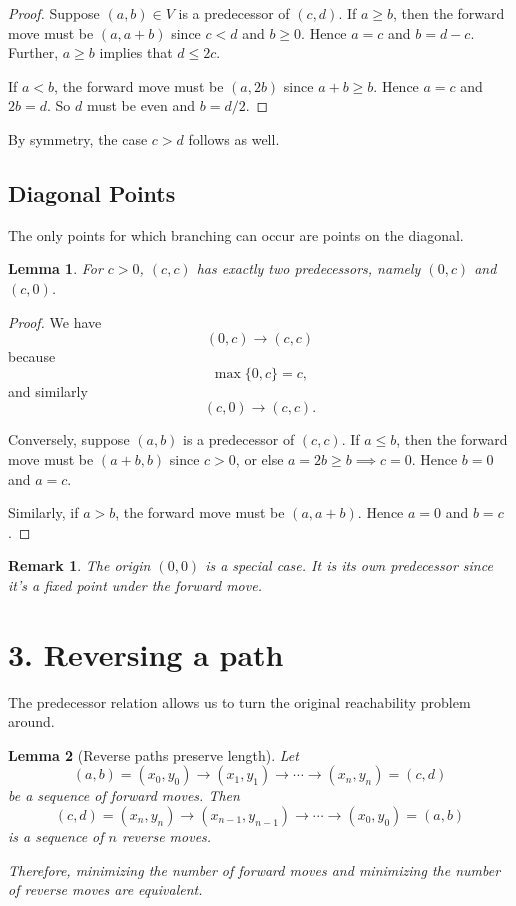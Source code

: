 \documentclass{article}
\newtheorem{lemma}{Lemma}
\newtheorem{remark}{Remark}
\begin{document}
\begin{proof}
	Suppose $(a,b)\in V$ is a predecessor of $(c, d)$. If $a \geq b$, then the forward move must be $(a, a+b)$ since $c<d$ and $b\geq 0$.
	Hence $a=c$ and $b=d-c$. Further, $a\geq b$ implies that $d\leq 2c$.

	If $a<b$, the forward move must be $(a, 2b)$ since $a+b\geq b$. Hence $a=c$ and $2b=d$. So $d$ must be even and $b=d/2$.

\end{proof}

By symmetry, the case $c > d$ follows as well.

\subsection*{Diagonal Points}

The only points for which branching can occur are points on the diagonal.

\begin{lemma}
	For $c>0$, $(c,c)$ has exactly two predecessors, namely $(0,c)$ and $(c,0)$.

\end{lemma}

\begin{proof}
	We have
	\[
		(0,c)\longrightarrow(c,c)
	\]
	because
	\[
		\max\{0,c\}=c,
	\]
	and similarly
	\[
		(c,0)\longrightarrow(c,c).
	\]

	Conversely, suppose $(a,b)$ is a predecessor of $(c,c)$. If $a \leq b$, then the forward move must be
	$(a+b, b)$ since $c>0$, or else $a=2b\geq b \implies c=0$. Hence $b=0$ and $a=c$.

	Similarly, if $a > b$, the forward move must be $(a, a+b)$. Hence $a=0$ and $b=c$.
\end{proof}

\begin{remark}
The origin $(0,0)$ is a special case. It is its own predecessor since it's a fixed point under the forward move.
\end{remark}

\section*{3. Reversing a path}

The predecessor relation allows us to turn the original reachability problem around.


\begin{lemma}[Reverse paths preserve length]
	Let
	\[
		(a,b)=(x_0,y_0)\longrightarrow
		(x_1,y_1)\longrightarrow\cdots\longrightarrow
		(x_n,y_n)=(c,d)
	\]
	be a sequence of forward moves. Then
	\[
		(c,d)=(x_n,y_n)\longrightarrow
		(x_{n-1},y_{n-1})\longrightarrow\cdots\longrightarrow
		(x_0,y_0)=(a,b)
	\]
	is a sequence of $n$ reverse moves.

	Therefore, minimizing the number of forward moves and minimizing the number of reverse moves are equivalent.
\end{lemma}
\end{document}
